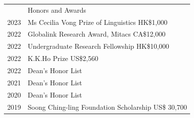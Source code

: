 \documentclass[letterpaper, 11pt]{article}
\newcommand{\headingfont}{\Large\color{MidnightBlue}}
\newenvironment{SectionTableSingleSpace}[1]{
	\renewcommand*{\arraystretch}{1.2}
	\setlength{\tabcolsep}{10pt}
	\begin{longtable}{Rp{6.3in}} & #1 \\[0.6em]}
{\end{longtable}\vspace{-.3cm}}
\begin{document}
\begin{SectionTableSingleSpace}{\headingfont Honors and Awards}
2023&
Ms Cecilia Vong Prize of Linguistics  \hfill HK\$1,000\\
2022&
Globalink Research Award, Mitacs \hfill CA\$12,000 \\
2022&
Undergraduate Research Fellowship \hfill HK\$10,000\\
2022&
K.K.Ho Prize  \hfill US\$2,560 \\
2022&
Dean's Honor List\hfill \\
2021&
Dean's Honor List\hfill \\
2020&
Dean's Honor List\hfill \\
2019&
Soong Ching-ling Foundation Scholarship  \hfill US\$ 30,700 \\
\end{SectionTableSingleSpace}



\end{document}
